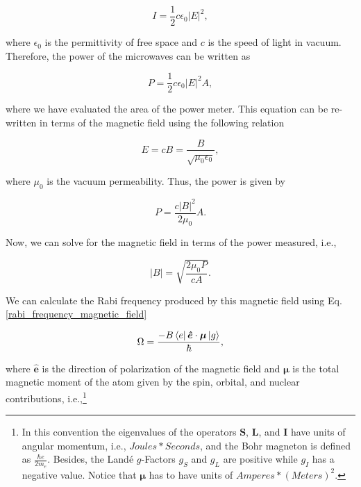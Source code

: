 \documentclass{article}
\begin{document}
\begin{equation}
    I = \frac{1}{2} c \epsilon_{0} |E|^{2},
\end{equation}

where $\epsilon_{0}$ is the permittivity of free space and $c$ is the speed of light in vacuum. Therefore, the power of the microwaves can be written as

\begin{equation}
    P = \frac{1}{2} c \epsilon_{0} |E|^{2} A,
\end{equation}

where we have evaluated the area of the power meter. This equation can be re-written in terms of the magnetic field using the following relation

\begin{equation}
    E = c B = \frac{B}{\sqrt{\mu_{0} \epsilon_{0}}},
\end{equation}

where $\mu_{0}$ is the vacuum permeability. Thus, the power is given by

\begin{equation}\label{power_in_terms_of_B}
    P = \frac{c |B|^{2}}{2 \mu_{0}} A.
\end{equation}

Now, we can solve for the magnetic field in terms of the power measured, i.e.,

\begin{equation}
    |B| = \sqrt{\frac{2 \mu_{0} P}{c A}}.
\end{equation}

We can calculate the Rabi frequency produced by this magnetic field using Eq. \ref{rabi_frequency_magnetic_field}

\begin{equation*}
\Omega = \frac{- B \bra{e} \boldsymbol{\hat{e}} \cdot \boldsymbol{\mu} \ket{g}}{\hbar},
\end{equation*}

where $\boldsymbol{\hat{e}}$ is the direction of polarization of the magnetic field and $\boldsymbol{\mu}$ is the total magnetic moment of the atom given by the spin, orbital, and nuclear contributions, i.e.,\footnote{In this convention the eigenvalues of the operators $\boldsymbol{S}$, $\boldsymbol{L}$, and $\boldsymbol{I}$ have units of angular momentum, i.e., $Joules*Seconds$, and the Bohr magneton is defined as $\frac{\hbar e}{2 m_{e}}$. Besides, the Landé $g$-Factors $g_{S}$ and $g_{L}$ are positive while $g_{I}$ has a negative value. Notice that $\boldsymbol{\mu}$ has to have units of $Amperes*(Meters)^2$.}
\end{document}
